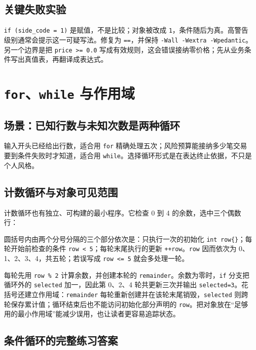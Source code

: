 \subsection{关键失败实验}

\texttt{if (side\_code = 1)} 是赋值，不是比较；对象被改成 \texttt{1}，条件随后为真。高警告级别通常会提示这一可疑写法。修复为 \texttt{==}，并保持 \texttt{-Wall -Wextra -Wpedantic}。另一个边界是把 \texttt{price >= 0.0} 写成有效规则，这会错误接纳零价格；先从业务条件写出真值表，再翻译成表达式。

\section[循环与作用域]{\texttt{for}、\texttt{while} 与作用域}

\subsection{场景：已知行数与未知次数是两种循环}

输入开头已经给出行数，适合用 \texttt{for} 精确处理五次；风险预算能接纳多少笔交易要到条件失败时才知道，适合用 \texttt{while}。选择循环形式是在表达终止依据，不只是个人风格。

\subsection{计数循环与对象可见范围}

计数循环也有独立、可构建的最小程序。它检查 0 到 4 的余数，选中三个偶数行：



圆括号内由两个分号分隔的三个部分依次是：只执行一次的初始化 \texttt{int row\{\}}；每轮开始前检查的条件 \texttt{row < 5}；每轮末尾执行的更新 \texttt{++row}。\texttt{row} 因而依次为 0、1、2、3、4，共五轮；若误写成 \texttt{row <= 5} 就会多处理一轮。

每轮先用 \texttt{row \% 2} 计算余数，并创建本轮的 \texttt{remainder}。余数为零时，\texttt{if} 分支把循环外的 \texttt{selected} 加一，因此第 0、2、4 轮共更新三次并输出 \texttt{selected=3}。花括号还建立作用域：\texttt{remainder} 每轮重新创建并在该轮末尾销毁，\texttt{selected} 则跨轮保存累计值；循环结束后也不能访问初始化部分声明的 \texttt{row}。把对象放在“足够用的最小作用域”能减少误用，也让读者更容易追踪状态。

\subsection{条件循环的完整练习答案}

